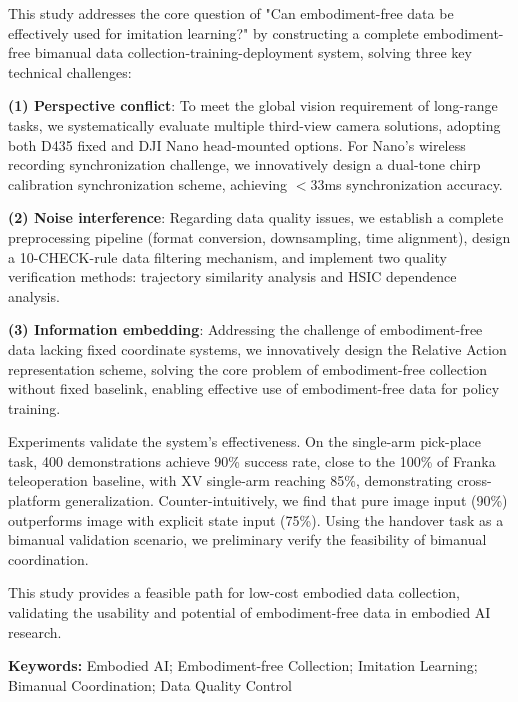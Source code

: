 This study addresses the core question of "Can embodiment-free data be effectively used for imitation learning?" by constructing a complete embodiment-free bimanual data collection-training-deployment system, solving three key technical challenges:

\textbf{(1) Perspective conflict}: To meet the global vision requirement of long-range tasks, we systematically evaluate multiple third-view camera solutions, adopting both D435 fixed and DJI Nano head-mounted options. For Nano's wireless recording synchronization challenge, we innovatively design a dual-tone chirp calibration synchronization scheme, achieving $<$33ms synchronization accuracy.

\textbf{(2) Noise interference}: Regarding data quality issues, we establish a complete preprocessing pipeline (format conversion, downsampling, time alignment), design a 10-CHECK-rule data filtering mechanism, and implement two quality verification methods: trajectory similarity analysis and HSIC dependence analysis.

\textbf{(3) Information embedding}: Addressing the challenge of embodiment-free data lacking fixed coordinate systems, we innovatively design the Relative Action representation scheme, solving the core problem of embodiment-free collection without fixed baselink, enabling effective use of embodiment-free data for policy training.

Experiments validate the system's effectiveness. On the single-arm pick-place task, 400 demonstrations achieve 90\% success rate, close to the 100\% of Franka teleoperation baseline, with XV single-arm reaching 85\%, demonstrating cross-platform generalization. Counter-intuitively, we find that pure image input (90\%) outperforms image with explicit state input (75\%). Using the handover task as a bimanual validation scenario, we preliminary verify the feasibility of bimanual coordination.

This study provides a feasible path for low-cost embodied data collection, validating the usability and potential of embodiment-free data in embodied AI research.

\vspace{1em}
\noindent\textbf{Keywords:} Embodied AI; Embodiment-free Collection; Imitation Learning; Bimanual Coordination; Data Quality Control

\newpage
